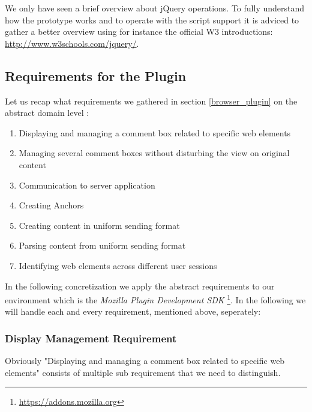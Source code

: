 We only have seen a brief overview about jQuery operations. To fully understand how the prototype works and to operate with the script support it is adviced to gather a better overview using for instance the official W3 introductions: \url{http://www.w3schools.com/jquery/}. 

\newpage
\subsection{Requirements for the Plugin}\label{firefox_plugin_requirements}
Let us recap what requirements we gathered in section \ref{browser_plugin} on the abstract domain level \cite{van2009requirements}:

\begin{enumerate}
\item Displaying and managing a comment box related to specific web elements
\item Managing several comment boxes without disturbing the view on original content
\item Communication to server application
\item Creating Anchors
\item Creating content in uniform sending format
\item Parsing content from uniform sending format
\item Identifying web elements across different user sessions
\end{enumerate}

In the following concretization we apply the abstract requirements to our environment which is the \emph{Mozilla Plugin Development SDK} \footnote{\url{https://addons.mozilla.org}}. In the following we will handle each and every requirement, mentioned above, seperately:

\subsubsection{Display Management Requirement}\label{display-management-requirement}
Obviously "Displaying and managing a comment box related to specific web elements" consists of multiple sub requirement that we need to distinguish. 

